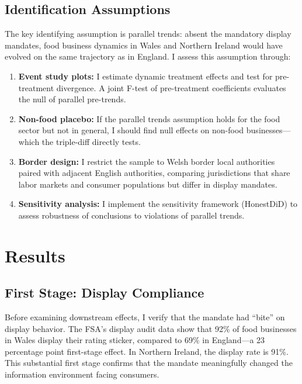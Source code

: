 \documentclass[12pt]{article}
\begin{document}
\subsection{Identification Assumptions}

The key identifying assumption is parallel trends: absent the mandatory display mandates, food business dynamics in Wales and Northern Ireland would have evolved on the same trajectory as in England. I assess this assumption through:

\begin{enumerate}
    \item \textbf{Event study plots:} I estimate dynamic treatment effects and test for pre-treatment divergence. A joint F-test of pre-treatment coefficients evaluates the null of parallel pre-trends.
    \item \textbf{Non-food placebo:} If the parallel trends assumption holds for the food sector but not in general, I should find null effects on non-food businesses---which the triple-diff directly tests.
    \item \textbf{Border design:} I restrict the sample to Welsh border local authorities paired with adjacent English authorities, comparing jurisdictions that share labor markets and consumer populations but differ in display mandates.
    \item \textbf{Sensitivity analysis:} I implement the \citet{rambachan2023more} sensitivity framework (HonestDiD) to assess robustness of conclusions to violations of parallel trends.
\end{enumerate}


\section{Results}
\label{sec:results}

\subsection{First Stage: Display Compliance}

Before examining downstream effects, I verify that the mandate had ``bite'' on display behavior. The FSA's display audit data show that 92\% of food businesses in Wales display their rating sticker, compared to 69\% in England---a 23 percentage point first-stage effect. In Northern Ireland, the display rate is 91\%. This substantial first stage confirms that the mandate meaningfully changed the information environment facing consumers.
\end{document}
